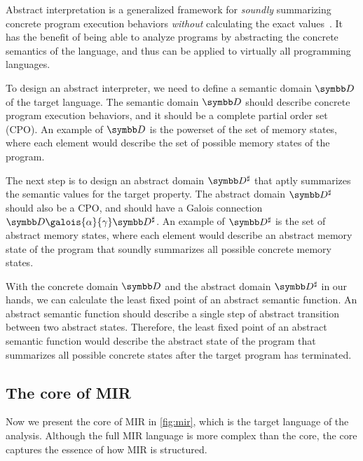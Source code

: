 \documentclass[en]{snu-ece-bsc-thesis}
\theoremstyle{definition}
\begin{document}
Abstract interpretation is a generalized framework for \emph{soundly} summarizing concrete program execution behaviors \emph{without} calculating the exact values~\cite{itsa}.
It has the benefit of being able to analyze programs by abstracting the concrete semantics of the language, and thus can be applied to virtually all programming languages.

To design an abstract interpreter, we need to define a semantic domain $\dom{D}$ of the target language.
The semantic domain $\dom{D}$ should describe concrete program execution behaviors, and it should be a complete partial order set (CPO).
An example of $\dom{D}$ is the powerset of the set of memory states, where each element would describe the set of possible memory states of the program.

The next step is to design an abstract domain $\dom*{D}$ that aptly summarizes the semantic values for the target property.
The abstract domain $\dom*{D}$ should also be a CPO, and should have a Galois connection $\dom{D} \galois{\alpha}{\gamma} \dom*{D}$.
An example of $\dom*{D}$ is the set of abstract memory states, where each element would describe an abstract memory state of the program that soundly summarizes all possible concrete memory states.

With the concrete domain $\dom{D}$ and the abstract domain $\dom*{D}$ in our hands, we can calculate the least fixed point of an abstract semantic function.
An abstract semantic function should describe a single step of abstract transition between two abstract states.
Therefore, the least fixed point of an abstract semantic function would describe the abstract state of the program that summarizes all possible concrete states after the target program has terminated.


\subsection{The core of MIR}
Now we present the core of MIR in \autoref{fig:mir}, which is the target language of the analysis.
Although the full MIR language is more complex than the core, the core captures the essence of how MIR is structured.
\end{document}
